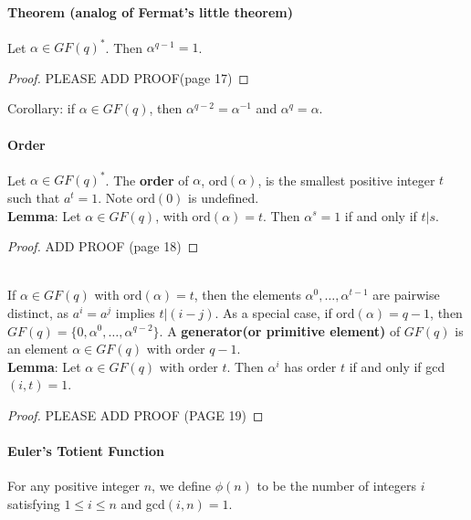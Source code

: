 \documentclass[10pt,letter]{article}
\theoremstyle{plain}
\theoremstyle{definition}
\begin{document}
\paragraph{Theorem (analog of Fermat's little theorem)}
Let $\alpha\in GF(q)^*$. Then $\alpha^{q-1}=1$.  
\begin{proof}
     PLEASE ADD PROOF(page 17)
\end{proof}
Corollary: if $\alpha\in GF(q)$, then $\alpha^{q-2}=\alpha^{-1}$ and $\alpha^q=\alpha$. 
\paragraph{Order}
Let $\alpha\in GF(q)^*$. The \textbf{order} of $\alpha$, ord$(\alpha)$, is the smallest positive integer $t$ such that $a^t=1$. Note ord$(0)$ is undefined. \\ 
\textbf{Lemma}: Let $\alpha\in GF(q)$, with ord$(\alpha)=t$. Then $\alpha^s=1$ if and only if $t|s$. 
\begin{proof}
     ADD PROOF (page 18)
\end{proof} \mbox{}\\
If $\alpha\in GF(q)$ with ord$(\alpha)=t$, then the elements $\alpha^0,\ldots,\alpha^{t-1}$ are pairwise distinct, as $a^i=a^j$ implies $t|(i-j)$. As a special case, if ord$(\alpha)=q-1$, then $GF(q)=\{0,\alpha^0,\ldots,\alpha^{q-2}\}$. A \textbf{generator(or primitive element)} of $GF(q)$ is an element $\alpha\in GF(q)$ with order $q-1$. \\ 
\textbf{Lemma}: Let $\alpha\in GF(q)$ with order $t$. Then $\alpha^i$ has order $t$ if and only if gcd$(i,t)=1$. 
\begin{proof}
     PLEASE ADD PROOF (PAGE 19)
\end{proof}

\paragraph{Euler's Totient Function}
For any positive integer $n$, we define $\phi(n)$ to be the number of integers $i$ satisfying $1\leq i\leq n$ and gcd$(i,n)=1$. 
\end{document}

